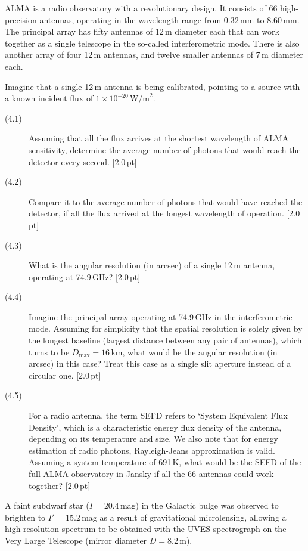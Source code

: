 ALMA is a radio observatory with a revolutionary design. It consists of 66
high-precision antennas, operating in the wavelength range from 0.32\,mm to
8.60\,mm. The principal array has fifty antennas of 12\,m diameter each that
can work together as a single telescope in the so-called interferometric
mode. There is also another array of four 12\,m antennas, and twelve smaller
antennas of 7\,m diameter each.

Imagine that a single 12\,m antenna is being calibrated, pointing to a source
with a known incident flux of $1 \times 10^{-20}\,\mathrm{W/m}^2$.

\begin{description}
\item[(4.1)] Assuming that all the flux arrives at the shortest wavelength of
  ALMA sensitivity, determine the average number of photons that would reach
  the detector every second. \hfill[2.0\,pt]
\item[(4.2)] Compare it to the average number of photons that would have
  reached the detector, if all the flux arrived at the longest wavelength of
  operation. \hfill[2.0\,pt]
\item[(4.3)] What is the angular resolution (in arcsec) of a single 12\,m
  antenna, operating at 74.9\,GHz? \hfill[2.0\,pt]
\item[(4.4)] Imagine the principal array operating at 74.9\,GHz in the
  interferometric mode. Assuming for simplicity that the spatial resolution
  is solely given by the longest baseline (largest distance between any pair
  of antennas), which turns to be $D_{\max} = 16$\,km, what would be the
  angular resolution (in arcsec) in this case? Treat this case as a single
  slit aperture instead of a circular one. \hfill[2.0\,pt]
\item[(4.5)] For a radio antenna, the term SEFD refers to `System Equivalent
  Flux Density', which is a characteristic energy flux density of the
  antenna, depending on its temperature and size. We also note that for
  energy estimation of radio photons, Rayleigh-Jeans approximation is valid.
  Assuming a system temperature of 691\,K, what would be the SEFD of the full
  ALMA observatory in Jansky if all the 66 antennas could work together?
  \hfill[2.0\,pt]
\end{description}

A faint subdwarf star ($I = 20.4$\,mag) in the Galactic bulge was observed to
brighten to $I' = 15.2$\,mag as a result of gravitational microlensing,
allowing a high-resolution spectrum to be obtained with the UVES spectrograph
on the Very Large Telescope (mirror diameter $D = 8.2$\,m).

